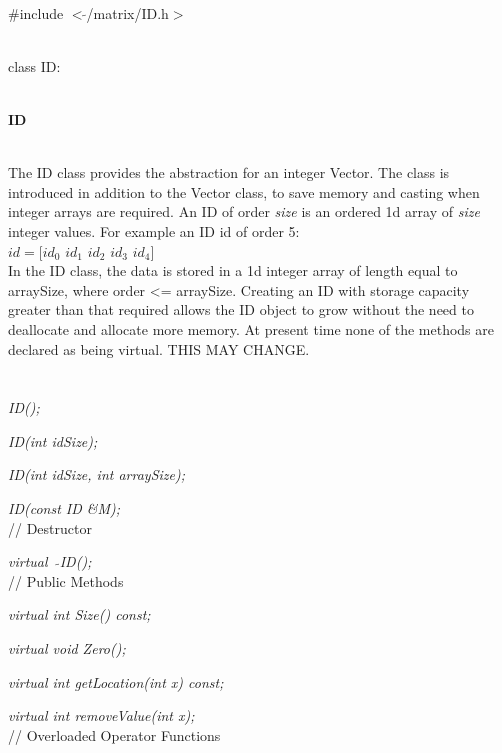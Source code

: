 
   \\
\#include $<\tilde{ }$/matrix/ID.h$>$  


  \\
class ID:  


 \\
{\bf ID} 


  \\
\indent The ID class provides the abstraction for an integer Vector. 
The class is introduced in addition to the Vector class, to save memory
and casting when integer arrays are required. An ID of order {\em
size} is an ordered 1d array of {\em size} integer values. For example
an ID id of order 5:  \\

\indent\indent $id = [id_0$ $id_1$ $id_2$ $id_3$ $id_4]$ \\

In the ID class, the data is stored in a 1d integer array of length
equal to arraySize, where order <= arraySize. Creating an ID with
storage capacity greater than that required allows the ID object to
grow without the need to deallocate and allocate more memory. At
present time none of the methods are declared as being virtual. THIS
MAY CHANGE. \\

 \\
  \\ 
{\em ID();}  

{\em  ID(int idSize);}  

{\em  ID(int idSize, int arraySize);}  

{\em  ID(const ID \&M); }  \\ 

{// Destructor} 

{\em virtual~ $\tilde{}$ID();}\\  

{// Public Methods }  

{\em virtual int Size() const;} 

{\em virtual void Zero();} 

{\em virtual int getLocation(int x) const;} 

{\em virtual int removeValue(int x);} \\ 

{// Overloaded Operator Functions}  

